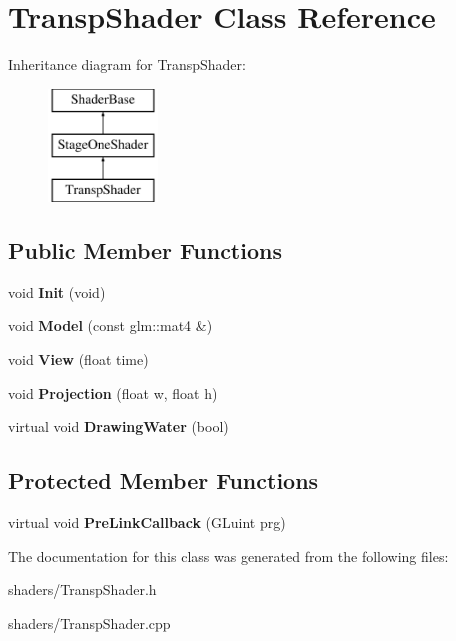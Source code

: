 \hypertarget{classTranspShader}{\section{\-Transp\-Shader \-Class \-Reference}
\label{classTranspShader}
}
\-Inheritance diagram for \-Transp\-Shader\-:\begin{figure}[H]
\begin{center}
\leavevmode
\includegraphics[height=3.000000cm]{classTranspShader}
\end{center}
\end{figure}
\subsection*{\-Public \-Member \-Functions}
\begin{DoxyCompactItemize}
\item 
\hypertarget{classTranspShader_a530c93707afcbdf03d21143020259889}{void {\bfseries \-Init} (void)}\label{classTranspShader_a530c93707afcbdf03d21143020259889}

\item 
\hypertarget{classTranspShader_aaf502a41554c7a9a6555db8fd4ae56f8}{void {\bfseries \-Model} (const glm\-::mat4 \&)}\label{classTranspShader_aaf502a41554c7a9a6555db8fd4ae56f8}

\item 
\hypertarget{classTranspShader_aaa300e0878a052d63b7c0b828cb2b6d4}{void {\bfseries \-View} (float time)}\label{classTranspShader_aaa300e0878a052d63b7c0b828cb2b6d4}

\item 
\hypertarget{classTranspShader_a59f6775b536885d5020e0b04b67aadbe}{void {\bfseries \-Projection} (float w, float h)}\label{classTranspShader_a59f6775b536885d5020e0b04b67aadbe}

\item 
\hypertarget{classTranspShader_a153486777748b97389afdabd3e575d0a}{virtual void {\bfseries \-Drawing\-Water} (bool)}\label{classTranspShader_a153486777748b97389afdabd3e575d0a}

\end{DoxyCompactItemize}
\subsection*{\-Protected \-Member \-Functions}
\begin{DoxyCompactItemize}
\item 
\hypertarget{classTranspShader_ac6532b597502b6e404c9cc5616964fd1}{virtual void {\bfseries \-Pre\-Link\-Callback} (\-G\-Luint prg)}\label{classTranspShader_ac6532b597502b6e404c9cc5616964fd1}

\end{DoxyCompactItemize}


\-The documentation for this class was generated from the following files\-:\begin{DoxyCompactItemize}
\item 
shaders/\-Transp\-Shader.\-h\item 
shaders/\-Transp\-Shader.\-cpp\end{DoxyCompactItemize}
